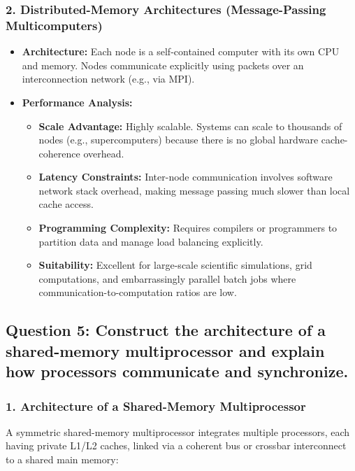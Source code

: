 \documentclass[11pt, a4paper]{article}
\begin{document}
\subsubsection*{2. Distributed-Memory Architectures (Message-Passing Multicomputers)}
\begin{itemize}
    \item \textbf{Architecture:} Each node is a self-contained computer with its own CPU and memory. Nodes communicate explicitly using packets over an interconnection network (e.g., via MPI).
    \item \textbf{Performance Analysis:}
    \begin{itemize}
        \item \textbf{Scale Advantage:} Highly scalable. Systems can scale to thousands of nodes (e.g., supercomputers) because there is no global hardware cache-coherence overhead.
        \item \textbf{Latency Constraints:} Inter-node communication involves software network stack overhead, making message passing much slower than local cache access.
        \item \textbf{Programming Complexity:} Requires compilers or programmers to partition data and manage load balancing explicitly.
        \item \textbf{Suitability:} Excellent for large-scale scientific simulations, grid computations, and embarrassingly parallel batch jobs where communication-to-computation ratios are low.
    \end{itemize}
\end{itemize}

\subsection*{Question 5: Construct the architecture of a shared-memory multiprocessor and explain how processors communicate and synchronize.}

\subsubsection*{1. Architecture of a Shared-Memory Multiprocessor}
A symmetric shared-memory multiprocessor integrates multiple processors, each having private L1/L2 caches, linked via a coherent bus or crossbar interconnect to a shared main memory:
\end{document}
